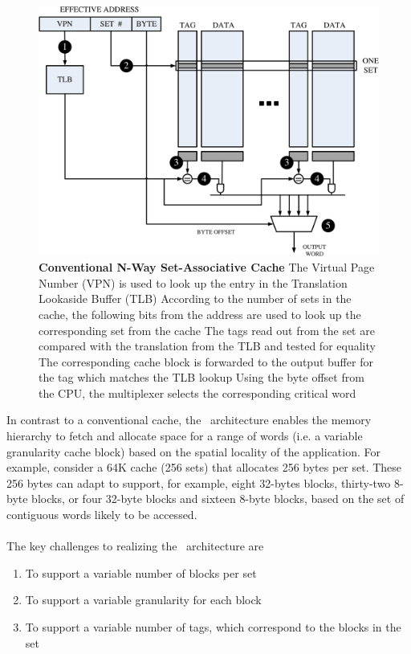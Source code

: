 \begin{figure}[b]
  \begin{center}
    \includegraphics[width=\textwidth]{files/Figures/06-NWaySetAssocCache.pdf}
    \caption[Conventional N-Way Set-Associative Cache]{\textbf{Conventional N-Way Set-Associative Cache}  The Virtual Page Number (VPN) is used to look up the entry in the Translation Lookaside Buffer (TLB)  According to the number of sets in the cache, the following bits from the address are used to look up the corresponding set from the cache  The tags read out from the set are compared with the translation from the TLB and tested for equality  The corresponding cache block is forwarded to the output buffer for the tag which matches the TLB lookup  Using the byte offset from the CPU, the multiplexer selects the corresponding critical word }
    \label{fig:set_assoc_arch}
  \end{center}
\end{figure}

\clearpage

In contrast to a conventional cache, the \AC\ architecture enables the memory hierarchy to fetch and allocate space for a range of words (i.e. a variable granularity cache block) based on the spatial locality of the application. For example, consider a 64K cache (256 sets) that allocates 256 bytes per set. These 256 bytes can adapt to support, for example, eight 32-bytes blocks, thirty-two 8-byte blocks, or four 32-byte blocks and sixteen 8-byte blocks, based on the set of contiguous words likely to be accessed. 
\\ \\
The key challenges to realizing the \AC\ architecture are
\begin{enumerate}[noitemsep]
	\item To support a variable number of blocks per set
	\item To support a variable granularity for each block
	\item To support a variable number of tags, which correspond to the blocks in the set
\end{enumerate}

